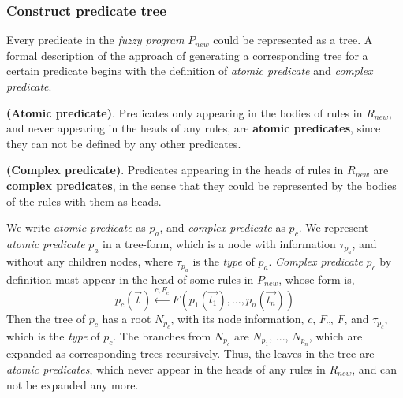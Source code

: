 \subsubsection{Construct predicate tree}
\label{sec:Construct}
Every predicate in the \textit{fuzzy program} $P_{new}$ could be represented as a tree. A formal description of the approach of generating a corresponding tree for a certain predicate begins with the definition of \textit{atomic predicate} and \textit{complex predicate}.
 
\begin{defin}\textbf{(Atomic predicate)}.
Predicates only appearing in the bodies of rules in $R_{new}$, and never appearing in the heads of any rules, are \textbf{atomic predicates}, since they can not be defined by any other predicates.  
\end{defin}

\begin{defin}\textbf{(Complex predicate)}.
Predicates appearing in the heads of rules in $R_{new}$ are \textbf{complex predicates}, in the sense that they could be represented by the bodies of the rules with them as heads. 
\end{defin}

We write \textit{atomic predicate} as $p_{a}$, and \textit{complex predicate} as $p_{c}$. We represent \textit{atomic predicate} $p_{a}$ in a tree-form, which is a node with information $\tau_{p_{a}}$, and without any children nodes, where $\tau_{p_{a}}$ is the \textit{type} of $p_{a}$. \textit{Complex predicate} $p_{c}$ by definition must appear in the head of some rules in $P_{new}$, whose form is,
\[p_{c}(\vec{t}) \stackrel{c,F_c}{\longleftarrow}F(p_1(\vec{t_1}),...,p_n(\vec{t_n}))\] 
Then the tree of $p_{c}$ has a root $N_{p_{c}}$, with its node information, $c$, $F_c$, $F$, and $\tau_{p_{c}}$, which is the \textit{type} of $p_{c}$. The branches from $N_{p_{c}}$ are $N_{p_1}$, ..., $N_{p_n}$, which are expanded as corresponding trees recursively. Thus, the leaves in the tree are \textit{atomic predicates}, which never appear in the heads of any rules in $R_{new}$, and can not be expanded any more.

\newpage


